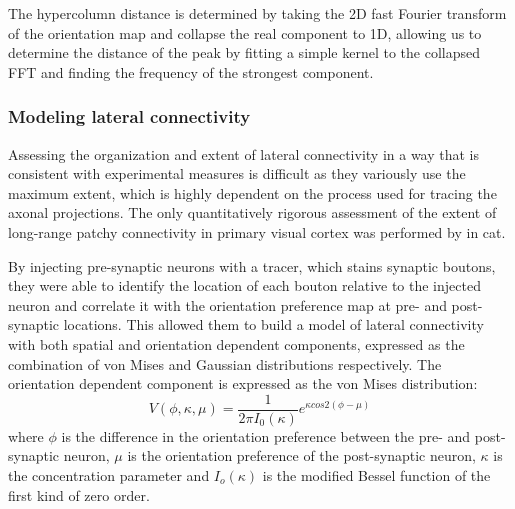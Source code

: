 The hypercolumn distance is determined by taking the 2D fast Fourier
transform of the orientation map and collapse the real component to
1D, allowing us to determine the distance of the peak by fitting a
simple kernel to the collapsed FFT and finding the frequency of the
strongest component.

\subsubsection{Modeling lateral connectivity} \label{BuzasEquations}

Assessing the organization and extent of lateral connectivity in a way
that is consistent with experimental measures is difficult as they
variously use the maximum extent, which is highly dependent on the
process used for tracing the axonal projections. The only quantitatively
rigorous assessment of the extent of long-range patchy connectivity in
primary visual cortex was performed by \cite{Buzas2006} in cat.

By injecting pre-synaptic neurons with a tracer, which stains synaptic
boutons, they were able to identify the location of each bouton
relative to the injected neuron and correlate it with the orientation
preference map at pre- and post-synaptic locations. This allowed them
to build a model of lateral connectivity with both spatial and
orientation dependent components, expressed as the combination of von
Mises and Gaussian distributions respectively. The orientation
dependent component is expressed as the von Mises distribution:
\begin{equation}
V(\phi, \kappa, \mu) = \frac{1}{2 \pi I_0(\kappa)} e^{\kappa cos 2(\phi - \mu)}
\end{equation}
where $\phi$ is the difference in the orientation preference between
the pre- and post-synaptic neuron, $\mu$ is the orientation preference
of the post-synaptic neuron, $\kappa$ is the concentration parameter
and $I_o(\kappa)$ is the modified Bessel function of the first kind of
zero order.

